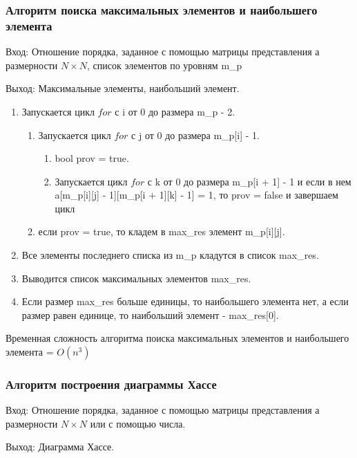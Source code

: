 \documentclass[bachelor, och, labwork]{shiza}
\begin{document}
		\subsubsection{Алгоритм поиска максимальных элементов и наибольшего элемента}

		$\textit{Вход:}$ Отношение порядка, заданное с помощью матрицы представления а размерности $N \times N$, список элементов по уровням m\_p
		
		$\textit{Выход:}$  Максимальные элементы, наибольший элемент.
		
		\begin{enumerate} 
			\item Запускается цикл $for$ с i от 0 до размера m\_p - 2.
			\begin{enumerate} 
				\item Запускается цикл $for$ с j от 0 до размера m\_p[i] - 1.
					\begin{enumerate} 
					\item bool prov = true.
					\item Запускается цикл $for$ с k от 0 до размера m\_p[i + 1] - 1 и если в нем a[m\_p[i][j] - 1][m\_p[i + 1][k] - 1] = 1, то prov = false и завершаем цикл
					\end{enumerate}
				\item если prov = true, то кладем в max\_res элемент m\_p[i][j].
			\end{enumerate} 
			\item Все элементы последнего списка из m\_p кладутся в список max\_res.
			\item Выводится список максимальных элементов max\_res.
			\item Если размер max\_res больше единицы, то наибольшего элемента нет, а если размер равен единице, то наибольший элемент - max\_res[0].
		\end{enumerate} 

		Временная сложность алгоритма поиска максимальных элементов и наибольшего элемента = $O(n^3)$		
	
		\subsubsection{Алгоритм построения диаграммы Хассе}	
	
	$\textit{Вход:}$ Отношение порядка, заданное с помощью матрицы представления а размерности $N \times N$ или с помощью числа.
	
	$\textit{Выход:}$  Диаграмма Хассе.
	
\end{document}
